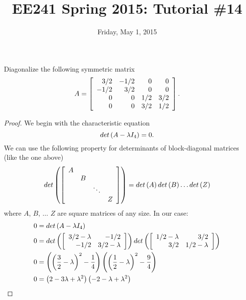 \documentclass{tutorial}
\begin{document}
\newif\ifsolns

\solnstrue

\title{EE241 Spring 2015: Tutorial \#14}
\date{Friday, May 1, 2015}
\maketitle

\begin{prob}
Diagonalize the following symmetric matrix
\[
  A = \left[ \begin{array}{rrrr}
     3/2 & -1/2 &    0 &    0 \\
    -1/2 &  3/2 &    0 &    0 \\
       0 &    0 &  1/2 &  3/2 \\
       0 &    0 &  3/2 &  1/2
  \end{array} \right] .
\]
\end{prob} \ifsolns \begin{proof}
We begin with the characteristic equation
\[
  det \left( A - \lambda I_4 \right) = 0 .
\]
We can use the following property for determinants of block-diagonal matrices (like the one above)
\[
  det \left( \left[ \begin{array}{cccc}
    A & & & \\
    & B & & \\
    & & \ddots & \\
    & & & Z
  \end{array} \right] \right) = det \left( A \right) det \left( B \right) \dots det \left( Z \right)
\]
where $A$, $B$, $\dots$ $Z$ are square matrices of any size. In our case:
\begin{align*}
  0 &= det \lp A - \lambda I_4 \rp \\
  0 &= det \lp \ls \begin{array}{rr} 3/2-\lambda & -1/2 \\ -1/2 & 3/2-\lambda \end{array} \rs \rp
       det \lp \ls \begin{array}{rr} 1/2-\lambda & 3/2 \\ 3/2 & 1/2-\lambda \end{array} \rs \rp \\
  0 &= \lp \lp \frac{3}{2}-\lambda \rp^2 - \frac{1}{4} \rp \lp \lp \frac{1}{2}-\lambda \rp^2 - \frac{9}{4} \rp \\
  0 &= \lp 2 - 3 \lambda + \lambda^2 \rp \lp -2 - \lambda + \lambda^2 \rp \\

\end{align*}
\end{proof}
\end{document}

